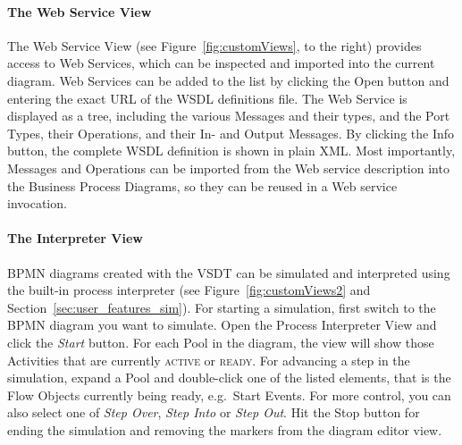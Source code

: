 
\paragraph*{The Web Service View}
The Web Service View (see Figure~\ref{fig:customViews}, to the right) provides
access to Web Services, which can be inspected and imported into the current
diagram.  Web Services can be added to the list by clicking the Open button and
entering the exact URL of the WSDL definitions file.  The Web Service is displayed
as a tree, including the various Messages and their types, and the Port Types,
their Operations, and their In- and Output Messages.  By clicking the Info button,
the complete WSDL definition is shown in plain XML.  Most importantly, Messages
and Operations can be imported from the Web service description into the Business
Process Diagrams, so they can be reused in a Web service invocation.

\paragraph*{The Interpreter View}
BPMN diagrams created with the VSDT can be simulated and interpreted using the
built-in process interpreter (see Figure~\ref{fig:customViews2} and
Section~\ref{sec:user_features_sim}).  For starting a simulation, first switch to
the BPMN diagram you want to simulate.  Open the Process Interpreter View and
click the \emph{Start} button.  For each Pool in the diagram, the view will show
those Activities that are currently \textsc{active} or \textsc{ready}.  For
advancing a step in the simulation, expand a Pool and double-click one of the
listed elements, that is the Flow Objects currently being ready, e.g.\ Start
Events.  For more control, you can also select one of \emph{Step Over}, \emph{Step
Into} or \emph{Step Out}.  Hit the Stop button for ending the simulation and
removing the markers from the diagram editor view.

